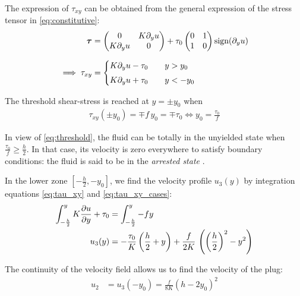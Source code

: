 \documentclass[11 pt]{report}
\begin{document}
The expression of $\tau_{xy}$ can be obtained from the general expression of the stress tensor in \eqref{eq:constitutive}:
\begin{align}
    \boldsymbol{\tau} &=
    \begin{pmatrix}
        0 & K \partial_y u\\
        K \partial_y u & 0\\
    \end{pmatrix} + \tau_0
    \begin{pmatrix}
        0 & 1\\
        1 & 0\\
    \end{pmatrix} \sign(\partial_y u) \\[6pt] %
    \implies \tau_{xy} &=
    \begin{cases}
        K \partial_y u - \tau_0  \qquad y > y_0\\[3pt]
        K \partial_y u + \tau_0  \qquad y < -y_0\\
    \end{cases} \label{eq:tau_xy_cases}
\end{align}

The threshold shear-stress is reached at $y=\pm y_0$ when 
\begin{align}
    \tau_{xy}(\pm y_0) = \mp f \, y_0 = \mp \tau_0 \iff y_0 = \frac{\tau_0}{f} \label{eq:threshold}
\end{align}

In view of \eqref{eq:threshold}, the fluid can be totally in the unyielded state when $\frac{\tau_0}{f} \geq \frac{h}{2}$. In that case, its velocity is zero everywhere to satisfy boundary conditions: the fluid is said to be in the \textit{arrested state} \cite{saramito2016complex}.

In the lower zone $[-\frac{h}{2}, -y_0]$, we find the velocity profile $u_3(y)$ by integration equations \eqref{eq:tau_xy} and \eqref{eq:tau_xy_cases}:
\begin{align}
    \int_{-\frac{h}{2}}^y K \pdv{u}{y} + \tau_0 &= \int_{-\frac{h}{2}}^y -f y\\
    u_3(y) &= -\frac{\tau_0}{K} \left(\frac{h}{2}+y\right) + \frac{f}{2K} \, \left(\left(\frac{h}{2}\right)^2 - y^2\right)
\end{align}

The continuity of the velocity field allows us to find the velocity of the plug:
\begin{align}
    u_2 &= u_3(-y_0) = %
    \frac{f}{8K} \left(h - 2y_0\right)^2
\end{align}
\end{document}

